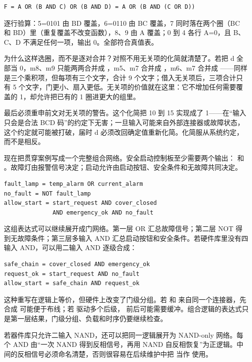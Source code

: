 \begin{lstlisting}
F = A OR (B AND C) OR (B AND D) = A OR (B AND (C OR D))
\end{lstlisting}

逐行验算：5=0101 由 BD 覆盖，6=0110 由 BC 覆盖，7 同时落在两个圈（BC 和 BD）里（重复覆盖不改变函数），8、9 由 A 覆盖；0 到 4 各行 A=0，且 B、C、D 不满足任何一项，输出 0。全部符合真值表。

为什么这样选圈，而不是逐对合并？对照不用无关项的化简就清楚了。若把 d 全部当 0，m8、m9 只能两两合并成 ，m5、m7 合并成 ，m6、m7 合并成 ——同样是三个乘积项，但每项有三个文字，合计 9 个文字；借入无关项后，三项合计只有 5 个文字，门更小、扇入更低。无关项的价值就在这里：它不增加任何需要覆盖的 1，却允许把已有的 1 圈进更大的组里。

最后必须重申前文对无关项的警告。这个化简把 10 到 15 实现成了 1——在“输入只会是合法 BCD 码”的约定下无害；一旦输入可能来自外部连接器或故障状态，这个约定就可能被打破，届时 d 必须改回确定值重新化简。化简服从系统约定，而不是相反。

现在把贯穿案例写成一个完整组合网络。安全启动控制板至少需要两个输出： 和 。故障灯由报警信号决定；启动允许由启动按钮、安全条件和无故障共同决定。

\begin{lstlisting}
fault_lamp = temp_alarm OR current_alarm
no_fault = NOT fault_lamp
allow_start = start_request AND cover_closed
              AND emergency_ok AND no_fault
\end{lstlisting}

这组表达式可以继续展开成门网络。第一层 OR 汇总故障信号；第二层 NOT 得到无故障条件；第三层多输入 AND 汇总启动按钮和安全条件。若硬件库里没有四输入 AND，可以用二输入 AND 逐级合成：

\begin{lstlisting}
safe_chain = cover_closed AND emergency_ok
request_ok = start_request AND no_fault
allow_start = safe_chain AND request_ok
\end{lstlisting}

这种重写在逻辑上等价，但硬件上改变了门级分组。若  和  来自同一个连接器，先合成  可能便于布线；若  驱动多个后级， 前后可能需要缓冲。组合逻辑的表达式只是第一层结果，门级分组、负载和时序仍要继续检查。

若器件库只允许二输入 NAND，还可以把同一逻辑展开为 NAND-only 网络。每个 AND 由“一次 NAND 得到反相信号，再用 NAND 自反相恢复”为正逻辑。中间的反相信号必须命名清楚，否则很容易在后续维护中把  当作  使用。

